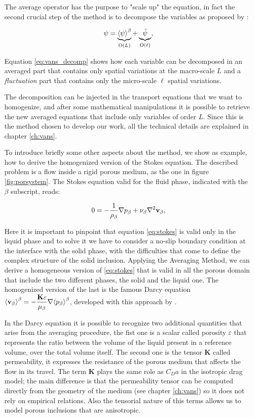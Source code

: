 The average operator has the purpose to "scale up" the equation, in fact the second crucial step of the method is to decompose the variables as proposed by \citet{gray1975derivation}:

\begin{equation}
\psi =   \underbrace{ {\left< \psi \right>}^{\beta} }_\text{O($L$)}  +  \underbrace{\tilde{\psi} }_\text{O($\ell$)},
\label{eq:vans_decomp}
\end{equation}

Equation \eqref{eq:vans_decomp} shows how each variable can be decomposed in an averaged part that contains only spatial variations at the macro-scale $L$ and a \textit{fluctuation} part that contains only the micro-scale $\ell$ spatial variations.

The decomposition can be injected in the transport equations that we want to homogenize, and after some mathematical manipulations it is possible to retrieve the new averaged equations that include only variables of order $L$.
Since this is the method chosen to develop our work, all the technical details are explained in chapter \ref{ch:vans}.

To introduce briefly some other aspects about the method, we show as example, how to derive the homogenized version of the Stokes equation. The described problem is a  flow inside a rigid porous medium, as the one in figure \ref{fig:porsystem}.
The Stokes equation valid for the fluid phase, indicated with the $\beta$ subscript, reads:

\begin{equation}
0 = -\dfrac{1}{\rho_{\beta}} \nabla p_{\beta} +\nu_{\beta} \nabla^2 \textbf{v}_{\beta},
\label{eq:stokes}
\end{equation} 

Here it is important to pinpoint that equation \eqref{eq:stokes} is valid only in the liquid phase and to solve it we have to consider a no-slip boundary condition at the interface with the solid phase, with the difficulties that come to define the complex structure of the solid inclusion.
Applying the Averaging Method, we can derive a homogeneous version of \eqref{eq:stokes} that is valid in all the porous domain that include the two different phases, the solid and the liquid one.
The homogenized version of the last is the famous Darcy equation ${\left< \textbf{v}_{\beta} \right>}^{\beta} = -\dfrac{\mathbf{K} \varepsilon}{\mu_{\beta}} \nabla {\left< p_{\beta} \right>}^{\beta}$, developed with this approach by  \citet{whitaker1986flow}.

In the Darcy equation it is possible to recognize two additional quantities that arise from the averaging procedure, the fist one is a scalar called porosity $\varepsilon$ that represents the ratio between the volume of the liquid present in a reference volume, over the total volume itself.
The second one is the tensor $\mathbf{K}$ called permeability, it expresses the resistance of the porous medium that affects the flow in its travel.
The term $\mathbf{K}$ plays the same role as $C_D a$ in the isotropic drag model; the main difference is that the permeability tensor can be computed directly from the geometry of the medium (see chapter \ref{ch:vans}) so it does not rely on empirical relations.
Also the tensorial nature of this terms allows us to model porous inclusions that are anisotropic.

